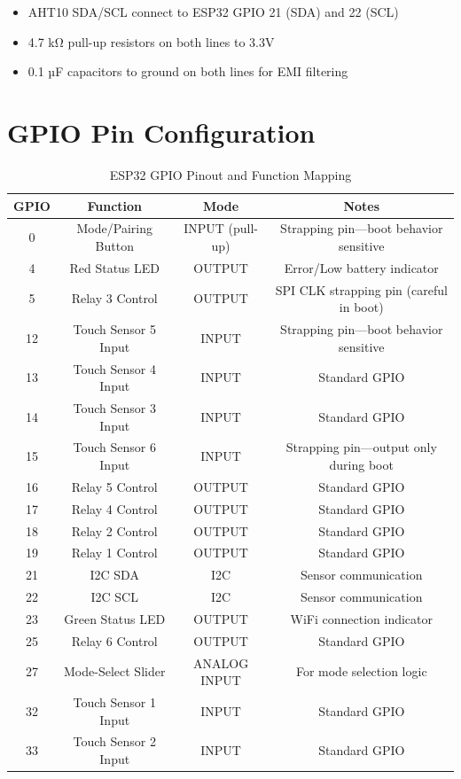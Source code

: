 \begin{itemize}
    \item AHT10 SDA/SCL connect to ESP32 GPIO 21 (SDA) and 22 (SCL)
    \item 4.7 kΩ pull-up resistors on both lines to 3.3V
    \item 0.1 µF capacitors to ground on both lines for EMI filtering
\end{itemize}

\section{GPIO Pin Configuration}

\begin{table}[H]
\centering
\caption{ESP32 GPIO Pinout and Function Mapping}
\label{tbl:gpio_mapping}
\begin{tabular}{|c|c|c|c|}
\hline
\textbf{GPIO} & \textbf{Function} & \textbf{Mode} & \textbf{Notes} \\
\hline
0 & Mode/Pairing Button & INPUT (pull-up) & Strapping pin—boot behavior sensitive \\
\hline
4 & Red Status LED & OUTPUT & Error/Low battery indicator \\
\hline
5 & Relay 3 Control & OUTPUT & SPI CLK strapping pin (careful in boot) \\
\hline
12 & Touch Sensor 5 Input & INPUT & Strapping pin—boot behavior sensitive \\
\hline
13 & Touch Sensor 4 Input & INPUT & Standard GPIO \\
\hline
14 & Touch Sensor 3 Input & INPUT & Standard GPIO \\
\hline
15 & Touch Sensor 6 Input & INPUT & Strapping pin—output only during boot \\
\hline
16 & Relay 5 Control & OUTPUT & Standard GPIO \\
\hline
17 & Relay 4 Control & OUTPUT & Standard GPIO \\
\hline
18 & Relay 2 Control & OUTPUT & Standard GPIO \\
\hline
19 & Relay 1 Control & OUTPUT & Standard GPIO \\
\hline
21 & I2C SDA & I2C & Sensor communication \\
\hline
22 & I2C SCL & I2C & Sensor communication \\
\hline
23 & Green Status LED & OUTPUT & WiFi connection indicator \\
\hline
25 & Relay 6 Control & OUTPUT & Standard GPIO \\
\hline
27 & Mode-Select Slider & ANALOG INPUT & For mode selection logic \\
\hline
32 & Touch Sensor 1 Input & INPUT & Standard GPIO \\
\hline
33 & Touch Sensor 2 Input & INPUT & Standard GPIO \\
\hline
\end{tabular}
\end{table}

